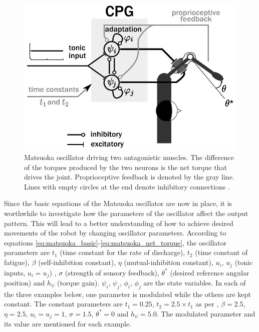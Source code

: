 \documentclass[12pt,twoside]{article}
\theoremstyle{plain}
\theoremstyle{definition}
\theoremstyle{remark}
\newcommand{\forceindent}{\leavevmode{\parindent=2em\indent}}
\begin{document}
\begin{figure}[hbtp]
  \begin{minipage}[c]{0.55\textwidth}
    \includegraphics[width=\textwidth]{figures/matsuoka_diagram.png}
  \end{minipage}\hfill
  \begin{minipage}[c]{0.4\textwidth}
    \caption{Matsuoka oscillator driving two antagonistic muscles. The difference of the torques produced by the two neurons is the net torque that drives the joint. Proprioceptive feedback is denoted by the gray line. Lines with empty circles at the end denote inhibitory connections \cite{Ronsse2009}.
        } \label{fig:matsuoka_diagram}
  \end{minipage}
\end{figure}

\forceindent Since the basic equations of the Matsuoka oscillator are now in place, it is worthwhile to investigate how the parameters of the oscillator affect the output pattern. This will lead to a better understanding of how to achieve desired movements of the robot by changing oscillator parameters. According to equations \ref{eq:matsuoka_basic}-\ref{eq:matsuoka_net_torque}, the oscillator parameters are $t_1$ (time constant for the rate of discharge), $t_2$ (time constant of fatigue), $\beta$ (self-inhibition constant), $\eta$ (mutual-inhibition constant), $u_i$, $u_j$ (tonic inputs, $u_i=u_j$) , $\sigma$ (strength of sensory feedback),  $\theta^*$ (desired reference angular position) and $h_{\psi}$ (torque gain). $\psi_i$, $\psi_j$, $\phi_i$, $\phi_j$ are the state variables. In each of the three examples below, one parameter is modulated while the others are kept constant. The constant parameters are $t_1=0.25$, $t_2= 2.5 \times t_1$ as per \cite{Ronsse2009}, $\beta=2.5$,  $\eta=2.5$, $u_i=u_j=1$, $\sigma=1.5$, $\theta^*=0$ and $h_{\psi}=5.0$. The modulated parameter and its value are mentioned for each example.\\ 
\end{document}
